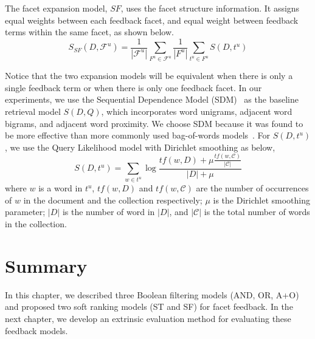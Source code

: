 The facet expansion model, $SF$, uses the facet structure information. It assigns equal weights between each feedback facet, and equal weight between feedback terms within the same facet, as shown below.
\begin{equation}
S_{SF}(D,\mathcal{F}^u) = \frac{1}{|\mathcal{F}^u|} \sum_{F^u \in \mathcal{F}^u}{ \frac{1}{|F^u|} \sum_{t^u \in F^u}{S(D, t^u)}}
\end{equation}

Notice that the two expansion models will be equivalent when there is only a single feedback term or when there is only one feedback facet. In our experiments, we use the Sequential Dependence Model (SDM)~\cite{metzler2005markov} as the baseline retrieval model $S(D,Q)$, which incorporates word unigrams, adjacent word bigrams, and adjacent word proximity. We choose SDM because it was found to be more effective than more commonly used bag-of-words models~\cite{huston2014comparison}. For $S(D,t^u)$, we use the Query Likelihood model with Dirichlet smoothing as below,
\begin{equation}
S(D,t^u)=\sum_{w\in t^u}{\log\frac{tf(w,D)+\mu\frac{tf(w,\mathcal{C})}{|\mathcal{C}|}}{|D|+\mu}}
\end{equation}
where $w$ is a word in $t^u$, $tf(w,D)$ and $tf(w,\mathcal{C})$ are the number of occurrences of $w$ in the document and the collection respectively; $\mu$ is the Dirichlet smoothing parameter; $|D|$ is the number of word in $|D|$, and $|\mathcal{C}|$ is the total number of words in the collection.

\section{Summary}
In this chapter, we described three Boolean filtering models (AND, OR, A+O) and proposed two soft ranking models (ST and SF) for facet feedback. In the next chapter, we develop an extrinsic evaluation method for evaluating these feedback models.